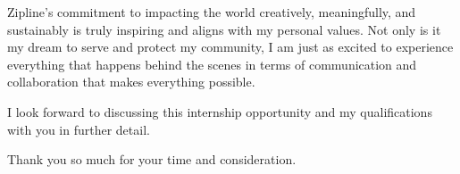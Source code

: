 \documentclass[11pt, letterpaper]{awesome-cv} %
\begin{document}
\begin{cvletter}
Zipline's commitment to impacting the world creatively, meaningfully, and sustainably is truly inspiring and aligns with my personal values. Not only is it my dream to serve and protect my community, I am just as excited to experience everything that happens behind the scenes in terms of communication and collaboration that makes everything possible.

I look forward to discussing this internship opportunity and my qualifications with you in further detail.

Thank you so much for your time and consideration.


\end{cvletter}


\makeletterclosing %
\end{document}
